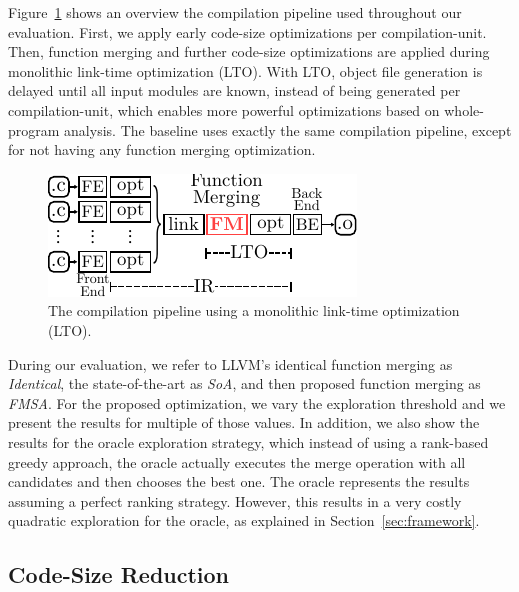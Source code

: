Figure~\ref{fig:opt-pipeline} shows an overview the compilation pipeline used
throughout our evaluation.
First, we apply early code-size
optimizations per compilation-unit.
Then, function merging and further code-size optimizations are applied during
monolithic link-time optimization (LTO).
With LTO, object file generation is delayed until all input modules are known,
instead of being generated per compilation-unit, which enables more powerful
optimizations based on whole-program analysis.
The baseline uses exactly the same compilation pipeline, except for not having
any function merging optimization.

\begin{figure}[h]
  \centering
  \includegraphics[width=0.8\linewidth]{figs/opt-pipeline.pdf}
  \caption{The compilation pipeline using a monolithic link-time optimization (LTO).}
  \label{fig:opt-pipeline}
\end{figure}


During our evaluation, we refer to LLVM's identical function merging as
\textit{Identical}, the state-of-the-art as \textit{SoA}, and then proposed
function merging as \textit{FMSA}.
For the proposed optimization, we vary the exploration threshold and we present
the results for multiple of those values.
In addition, we also show the results for the oracle exploration strategy,
which instead of using a rank-based greedy approach, the oracle actually
executes the merge operation with all candidates and then chooses the
best one.
The oracle represents the results assuming a perfect ranking strategy.
However, this results in a very costly quadratic exploration for the oracle, as
explained in Section~\ref{sec:framework}.

\subsection{Code-Size Reduction}



